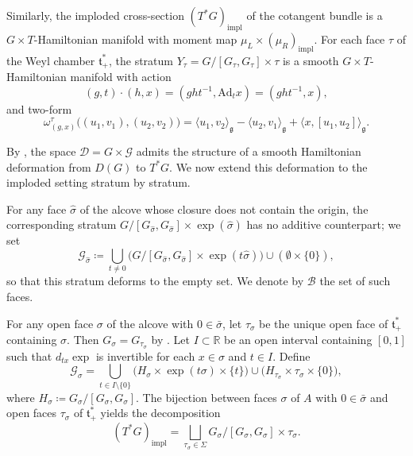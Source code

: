 \documentclass[reqno]{amsart}
\theoremstyle{plain}
\theoremstyle{definition}
\begin{document}
Similarly, the imploded cross-section $(T^*G)_{\mathrm{impl}}$ of the cotangent bundle is a $G\times T$-Hamiltonian manifold with moment map $\mu_L \times (\mu_R)_{\mathrm{impl}}$. For each face $\tau$ of the Weyl chamber $\mathfrak{t}^*_+$, the stratum $Y_\tau = G/[G_\tau, G_\tau] \times \tau$ is a smooth $G\times T$-Hamiltonian manifold with action
\begin{equation}\label{eq qh}
(g,t) \cdot (h, x) = (ght^{-1}, \mathrm{Ad}_t x) = (ght^{-1}, x),
\end{equation}
and two-form
\begin{equation}
\omega^\tau_{(g,x)}\bigl((u_1, v_1), (u_2, v_2)\bigr) = \langle u_1, v_2 \rangle_{\mathfrak{g}} - \langle u_2, v_1 \rangle_{\mathfrak{g}} + \langle x, [u_1, u_2] \rangle_{\mathfrak{g}}.
\end{equation}

By \cite[Theorem~4.1]{JMM2025deformations}, the space $\mathcal{D} = G \times \mathcal{G}$ admits the structure of a smooth Hamiltonian deformation from $D(G)$ to $T^*G$. We now extend this deformation to the imploded setting stratum by stratum.

For any face $\hat{\sigma}$ of the alcove whose closure does not contain the origin, the corresponding stratum $G/[G_{\hat{\sigma}}, G_{\hat{\sigma}}] \times \exp(\hat{\sigma})$ has no additive counterpart; we set
\[
\mathcal{G}_{\hat{\sigma}} \coloneqq \bigcup_{t \neq 0} \bigl(G/[G_{\hat{\sigma}}, G_{\hat{\sigma}}] \times \exp(t\hat{\sigma})\bigr) \cup (\emptyset \times \{0\}),
\]
so that this stratum deforms to the empty set. We denote by $\mathcal{B}$ the set of such faces.

For any open face $\sigma$ of the alcove with $0 \in \bar{\sigma}$, let $\tau_\sigma$ be the unique open face of $\mathfrak{t}^*_+$ containing $\sigma$. Then $G_\sigma = G_{\tau_\sigma}$ by \cite[Appendix~A.3]{hurtubise2006group}. Let $I \subset \mathbb{R}$ be an open interval containing $[0,1]$ such that $d_{tx}\exp$ is invertible for each $x \in \sigma$ and $t \in I$. Define
\[
\mathcal{G}_\sigma = \bigcup_{t \in I \setminus \{0\}} \bigl(H_\sigma \times \exp(t\sigma) \times \{t\}\bigr) \cup \bigl(H_{\tau_\sigma} \times \tau_\sigma \times \{0\}\bigr),
\]
where $H_\sigma \coloneqq G_\sigma/[G_\sigma, G_\sigma]$. The bijection between faces $\sigma$ of $A$ with $0 \in \bar{\sigma}$ and open faces $\tau_\sigma$ of $\mathfrak{t}^*_+$ yields the decomposition
\[
(T^*G)_{\mathrm{impl}} = \bigsqcup_{\tau_\sigma \in \Sigma} G_\sigma/[G_\sigma, G_\sigma] \times \tau_\sigma.
\]
\end{document}
